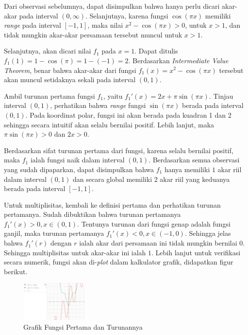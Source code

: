 \documentclass[11pt, a4paper, onecolumn, oneside, final]{report}
\begin{document}
Dari observasi sebelumnya, dapat disimpulkan bahwa hanya perlu dicari akar-akar pada interval $(0, \infty)$. Selanjutnya, karena fungsi $\cos(\pi x)$ memiliki \textit{range} pada interval $[-1, 1]$, maka nilai $x^2 - \cos(\pi x) > 0$, untuk $x > 1$, dan tidak mungkin akar-akar persamaan tersebut muncul untuk $x > 1$.

Selanjutnya, akan dicari nilai $f_1$ pada $x = 1$. Dapat ditulis $f_1(1) =  1 - \cos(\pi) = 1 - (-1) = 2$. Berdasarkan \textit{Intermediate Value Theorem}, benar bahwa akar-akar dari fungsi $f_1(x) = x^2 - \cos(\pi x)$ tersebut akan muncul setidaknya sekali pada interval $(0, 1)$.

Ambil turunan pertama fungsi $f_1$, yaitu $f_1'(x) = 2x + \pi \sin(\pi x)$. Tinjau interval $(0, 1)$, perhatikan bahwa \textit{range} fungsi $\sin(\pi x)$ berada pada interval $(0, 1)$. Pada koordinat polar, fungsi ini akan berada pada kuadran 1 dan 2 sehingga secara intuitif akan selalu bernilai positif. Lebih lanjut, maka $\pi \sin(\pi x) > 0$ dan $2x > 0$.

Berdasarkan sifat turunan pertama dari fungsi, karena selalu bernilai positif, maka $f_1$ ialah fungsi naik dalam interval $(0, 1)$. Berdasarkan semua observasi yang sudah dipaparkan, dapat disimpulkan bahwa $f_1$ hanya memiliki $1$ akar riil dalam interval $(0, 1)$ dan secara global memiliki $2$ akar riil yang keduanya berada pada interval $[-1, 1]$.

Untuk multiplisitas, kembali ke definisi pertama dan perhatikan turunan pertamanya. Sudah dibuktikan bahwa turunan pertamanya $f_1'(x) > 0, x \in (0, 1)$. Tentunya turunan dari fungsi genap adalah fungsi ganjil, maka turunan pertamanya $f_1'(x) < 0, x \in (-1, 0)$. Sehingga jelas bahwa $f_1'(r)$ dengan $r$ ialah akar dari persamaan ini tidak mungkin bernilai $0$. Sehingga multiplisitas untuk akar-akar ini ialah $1$. Lebih lanjut untuk verifikasi secara numerik, fungsi akan di-\textit{plot} dalam kalkulator grafik, didapatkan figur berikut.

\begin{figure}[h!]
    \centering
    \includegraphics[width=0.3\textwidth]{assets/A1_1.png}
    \caption{Grafik Fungsi Pertama dan Turunannya}
\end{figure}
\end{document}
